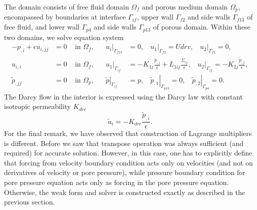 \documentclass[12pt,a4paper]{article}
\newcommand{\ord}{\epsilon}
\begin{document}
The domain consists of free fluid domain $\Omega_f$ and porous medium domain $\Omega_p$, encompassed by boundaries at interface $\Gamma_{if}$, upper wall $\Gamma_{f2}$ and side walls $\Gamma_{f13}$ of free fluid, and lower wall $\Gamma_{p4}$ and side walls $\Gamma_{p13}$ of porous domain. Within these two domains, we solve equation system
\begin{align}
- p_{,i} + \ord u_{i,jj} & = 0 & \mbox{ in } \Omega_f, & & \left. u_i \right|_{\Gamma_{f13}} & = 0, \ \ \ \ \left. u_1 \right|_{\Gamma_{f2}} = Udrv, \ \ \ \ \left. u_2 \right|_{\Gamma_{f2}} = 0, \\
u_{i,i} & = 0 & \mbox{ in } \Omega_f, & & \left. u_1 \right|_{\Gamma_{if}} & = - K_{1j} \frac{p_{,j}}{\ord} + L_{1ij} \frac{\Sigma_{ij}}{\ord}, \ \ \ \ \left. u_2 \right|_{\Gamma_{if}} = - K_{2j} \frac{\tilde{p}_{,j}}{\ord}, \\
\tilde{p}_{,jj} & = 0 & \mbox{ in } \Omega_p, & & \left. \tilde{p} \right|_{\Gamma_{if}} & = p, \ \ \ \ \left. \tilde{p}_{,1} \right|_{\Gamma_{p13}} = 0, \ \ \ \ \left. \tilde{p}_{,2} \right|_{\Gamma_{p4}} = 0.
\end{align}
The Darcy flow in the interior is expressed using the Darcy law with constant isotropic permeability $K_{drc}$
\begin{equation}
\tilde{u}_i = - K_{drc} \frac{\tilde{p}_{,i}}{\ord} .
\end{equation}
For the final remark, we have observed that
construction of Lagrange multipliers is different. Before we saw that transpose operation was always sufficient (and required) for accurate solution. However, in this case, one has to explicitly define that forcing from velocity boundary condition acts only on velocities (and not on derivatives of velocity or pore pressure), while pressure boundary condition for pore pressure equation acts only as forcing in the pore pressure equation.
Otherwise, the weak form and solver is constructed exactly as described in the previous section.
\end{document}
